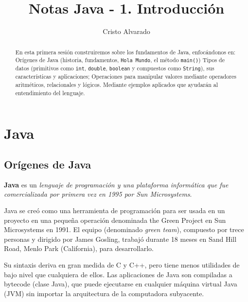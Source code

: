 \documentclass[12pt]{article}
\theoremstyle{largebreak}
\begin{document}
    \setlength{\parskip}{5pt} %
    \setlength{\parindent}{12pt} %
    \title{Notas Java - 1. Introducción}
    \author{Cristo Alvarado}
    \maketitle

    \begin{abstract}
        En esta primera sesión construiremos sobre los fundamentos de Java, enfocándonos en: Orígenes de Java (historia, fundamentos, \lstinline|Hola Mundo|, el método \lstinline|main()|) Tipos de datos (primitivos como \lstinline|int|, \lstinline|double|, \lstinline|boolean| y compuestos como \lstinline|String|), sus características y aplicaciones; Operaciones para manipular valores mediante operadores aritméticos, relacionales y lógicos. Mediante ejemplos aplicados que ayudarán al entendimiento del lenguaje.
    \end{abstract}
    
    \tableofcontents

    \lstlistoflistings

    \section{Java}

    \subsection{Orígenes de Java}

    \begin{mydef}
        \textbf{Java} es un \textit{lenguaje de programación y una plataforma informática que fue comercializada por primera vez en 1995 por Sun Microsystems}.
    \end{mydef}

    Java se creó como una herramienta de programación para ser usada en un proyecto en una pequeña operación denominada the Green Project en Sun Microsystems en 1991. El equipo (denominado \textit{green team}), compuesto por trece personas y dirigido por James Gosling, trabajó durante 18 meses en Sand Hill Road, Menlo Park (California), para desarrollarlo.

    Su sintaxis deriva en gran medida de C y C++, pero tiene menos utilidades de bajo nivel que cualquiera de ellos. Las aplicaciones de Java son compiladas a bytecode (clase Java), que puede ejecutarse en cualquier máquina virtual Java (JVM) sin importar la arquitectura de la computadora subyacente.
\end{document}
